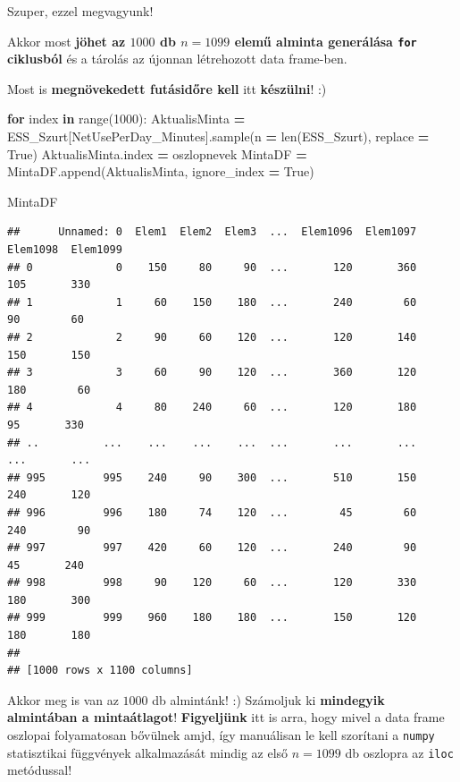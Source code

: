 \documentclass[
]{book}
\newenvironment{Shaded}{\begin{snugshade}}{\end{snugshade}}
\newcommand{\BuiltInTok}[1]{#1}
\newcommand{\ControlFlowTok}[1]{\textcolor[rgb]{0.13,0.29,0.53}{\textbf{#1}}}
\newcommand{\DecValTok}[1]{\textcolor[rgb]{0.00,0.00,0.81}{#1}}
\newcommand{\KeywordTok}[1]{\textcolor[rgb]{0.13,0.29,0.53}{\textbf{#1}}}
\newcommand{\NormalTok}[1]{#1}
\newcommand{\OperatorTok}[1]{\textcolor[rgb]{0.81,0.36,0.00}{\textbf{#1}}}
\newcommand{\StringTok}[1]{\textcolor[rgb]{0.31,0.60,0.02}{#1}}
\newcommand{\VariableTok}[1]{\textcolor[rgb]{0.00,0.00,0.00}{#1}}
\begin{document}
Szuper, ezzel megvagyunk!

Akkor most \textbf{jöhet az \(1000\) db \(n=1099\) elemű alminta generálása \texttt{for} ciklusból} és a tárolás az újonnan létrehozott data frame-ben.

Most is \textbf{megnövekedett futásidőre kell} itt \textbf{készülni}! :)

\begin{Shaded}
\begin{Highlighting}[]
\ControlFlowTok{for}\NormalTok{ index }\KeywordTok{in} \BuiltInTok{range}\NormalTok{(}\DecValTok{1000}\NormalTok{):}
\NormalTok{  AktualisMinta }\OperatorTok{=}\NormalTok{ ESS\_Szurt[}\StringTok{\textquotesingle{}NetUsePerDay\_Minutes\textquotesingle{}}\NormalTok{].sample(n }\OperatorTok{=} \BuiltInTok{len}\NormalTok{(ESS\_Szurt), replace }\OperatorTok{=} \VariableTok{True}\NormalTok{)}
\NormalTok{  AktualisMinta.index }\OperatorTok{=}\NormalTok{ oszlopnevek}
\NormalTok{  MintaDF }\OperatorTok{=}\NormalTok{ MintaDF.append(AktualisMinta, ignore\_index }\OperatorTok{=} \VariableTok{True}\NormalTok{)}

\NormalTok{MintaDF}
\end{Highlighting}
\end{Shaded}

\begin{verbatim}
##      Unnamed: 0  Elem1  Elem2  Elem3  ...  Elem1096  Elem1097  Elem1098  Elem1099
## 0             0    150     80     90  ...       120       360       105       330
## 1             1     60    150    180  ...       240        60        90        60
## 2             2     90     60    120  ...       120       140       150       150
## 3             3     60     90    120  ...       360       120       180        60
## 4             4     80    240     60  ...       120       180        95       330
## ..          ...    ...    ...    ...  ...       ...       ...       ...       ...
## 995         995    240     90    300  ...       510       150       240       120
## 996         996    180     74    120  ...        45        60       240        90
## 997         997    420     60    120  ...       240        90        45       240
## 998         998     90    120     60  ...       120       330       180       300
## 999         999    960    180    180  ...       150       120       180       180
## 
## [1000 rows x 1100 columns]
\end{verbatim}

Akkor meg is van az \(1000\) db almintánk! :) Számoljuk ki \textbf{mindegyik almintában a mintaátlagot}!
\textbf{Figyeljünk} itt is arra, hogy mivel a data frame oszlopai folyamatosan bővülnek amjd, így manuálisan le kell szorítani a \texttt{numpy} statisztikai függvények alkalmazását mindig az első \(n=1099\) db oszlopra az \texttt{iloc} metódussal!
\end{document}
